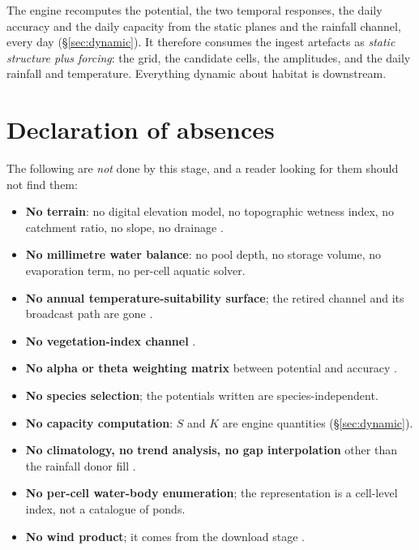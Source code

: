 \documentclass[11pt,a4paper]{article} \usepackage[utf8]{inputenc} \usepackage{lmodern} \usepackage[T1]{fontenc}
\begin{document}
The engine recomputes the potential, the two temporal responses, the daily accuracy and the
daily capacity from the static planes and the rainfall channel, every day (\S\ref{sec:dynamic}).
It therefore consumes the ingest artefacts as \emph{static structure plus forcing}: the grid,
the candidate cells, the amplitudes, and the daily rainfall and temperature. Everything dynamic
about habitat is downstream.

\section{Declaration of absences} \label{sec:absences}

The following are \emph{not} done by this stage, and a reader looking for them should not find
them:

\begin{itemize}
\item \textbf{No terrain}: no digital elevation model, no topographic wetness index, no
catchment ratio, no slope, no drainage .
\item \textbf{No millimetre water balance}: no pool depth, no storage volume, no evaporation
term, no per-cell aquatic solver. 
\item \textbf{No annual temperature-suitability surface}; the
retired channel and its broadcast path are gone
. 
\item \textbf{No vegetation-index
channel} . 
\item \textbf{No alpha or
theta weighting matrix} between potential and accuracy
. 
\item \textbf{No species selection};
the potentials written are species-independent. 
\item \textbf{No capacity computation}: $S$ and
$K$ are engine quantities (\S\ref{sec:dynamic}). 
\item \textbf{No climatology, no trend
analysis, no gap interpolation} other than the rainfall donor fill
. 
\item \textbf{No per-cell water-body
enumeration}; the representation is a cell-level index, not a catalogue of ponds. 
\item
\textbf{No wind product}; it comes from the download stage
.
\end{itemize}
\end{document}
